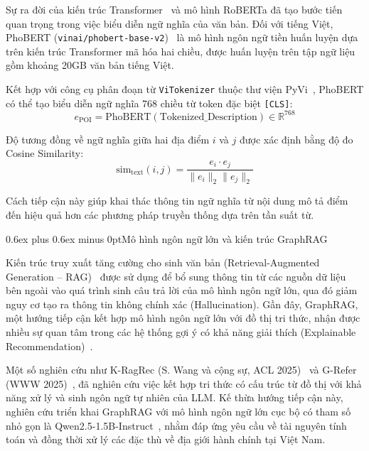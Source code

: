 \documentclass[journal,onecolumn,10pt]{IEEEtran}
\makeatletter
\newcommand{\code}[1]{\texttt{#1}}
\def\subsection{\@startsection{subsection}{2}{\z@}{1.8ex plus 1.0ex minus 0.3ex}%
{0.6ex plus 0.6ex minus 0pt}{\normalfont\normalsize\bfseries}}
\makeatother
\begin{document}
Sự ra đời của kiến trúc Transformer~\cite{r22} và mô hình RoBERTa đã tạo bước tiến quan trọng trong việc biểu diễn ngữ nghĩa của văn bản. Đối với tiếng Việt, PhoBERT (\code{vinai/phobert-base-v2})~\cite{r6} là mô hình ngôn ngữ tiền huấn luyện dựa trên kiến trúc Transformer mã hóa hai chiều, được huấn luyện trên tập ngữ liệu gồm khoảng 20GB văn bản tiếng Việt.

Kết hợp với công cụ phân đoạn từ \texttt{ViTokenizer} thuộc thư viện PyVi~\cite{r7}, PhoBERT có thể tạo biểu diễn ngữ nghĩa 768 chiều từ token đặc biệt \code{[CLS]}:
\begin{equation}
e_{\text{POI}} = \text{PhoBERT}(\text{Tokenized\_Description}) \in \mathbb{R}^{768}
\end{equation}

Độ tương đồng về ngữ nghĩa giữa hai địa điểm $i$ và $j$ được xác định bằng độ đo Cosine Similarity:
\begin{equation}
\text{sim}_{\text{text}}(i, j) = \frac{e_i \cdot e_j}{\|e_i\|_2 \|e_j\|_2}
\end{equation}

Cách tiếp cận này giúp khai thác thông tin ngữ nghĩa từ nội dung mô tả điểm đến hiệu quả hơn các phương pháp truyền thống dựa trên tần suất từ.


\subsection{Mô hình ngôn ngữ lớn và kiến trúc GraphRAG}

Kiến trúc truy xuất tăng cường cho sinh văn bản (Retrieval-Augmented Generation -- RAG)~\cite{r9, r10} được sử dụng để bổ sung thông tin từ các nguồn dữ liệu bên ngoài vào quá trình sinh câu trả lời của mô hình ngôn ngữ lớn, qua đó giảm nguy cơ tạo ra thông tin không chính xác (Hallucination). Gần đây, GraphRAG, một hướng tiếp cận kết hợp mô hình ngôn ngữ lớn với đồ thị tri thức, nhận được nhiều sự quan tâm trong các hệ thống gợi ý có khả năng giải thích (Explainable Recommendation)~\cite{r8, r23, r24}.

Một số nghiên cứu như K-RagRec (S. Wang và cộng sự, ACL 2025)~\cite{r23} và G-Refer (WWW 2025)~\cite{r25}, đã nghiên cứu việc kết hợp tri thức có cấu trúc từ đồ thị với khả năng xử lý và sinh ngôn ngữ tự nhiên của LLM. Kế thừa hướng tiếp cận này, nghiên cứu triển khai GraphRAG với mô hình ngôn ngữ lớn cục bộ có tham số nhỏ gọn là Qwen2.5-1.5B-Instruct~\cite{r19}, nhằm đáp ứng yêu cầu về tài nguyên tính toán và đồng thời xử lý các đặc thù về địa giới hành chính tại Việt Nam.
\end{document}
